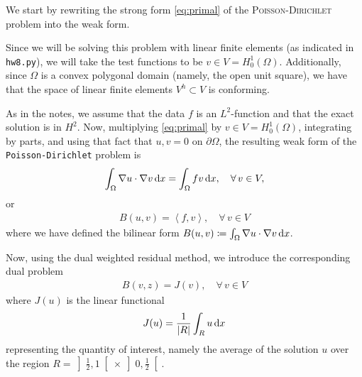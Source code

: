 \begin{solution}
We start by rewriting the strong form \eqref{eq:primal} of the \textsc{Poisson-Dirichlet} problem into the weak form.

Since we will be solving this problem with linear finite elements (as indicated in \texttt{hw8.py}), we will take the test functions to be $v \in V = H_0^1(\Omega)$.
Additionally, since $\Omega$ is a convex polygonal domain (namely, the open unit square), we have that the space of linear finite elements $V^h \subset V$ is conforming.

As in the notes, we assume that the data $f$ is an $L^2$-function and that the exact solution is in $H^2$.
Now, multiplying \eqref{eq:primal} by $v \in V = H_0^1(\Omega)$, integrating by parts, and using that fact that $u,v = 0$ on $\partial \Omega$, the resulting weak form of the \texttt{Poisson-Dirichlet} problem is
\begin{align*}
	\int_\Omega \nabla u \cdot \nabla v \operatorname{d}\!{x}
    = \int_\Omega f v \operatorname{d}\!{x},
    \quad \forall \, v \in V,
\end{align*}
or
\begin{align}\tag{W}\label{eq:primal-weak}
	B(u,v) = \left\langle f, v \right\rangle,
    \quad \forall \, v \in V
\end{align}
where we have defined the bilinear form $B(u,v) \coloneqq \int_\Omega \nabla u \cdot \nabla v \operatorname{d}\!{x}$.

Now, using the dual weighted residual method, we introduce the corresponding dual problem
\begin{align}\tag{W*}\label{eq:dual-weak}
	B(v,z) = J(v),
    \quad \forall \, v \in V
\end{align}
where $J(u)$ is the linear functional
\begin{align}\label{eq:J-defn}
	J(u) = \frac{1}{|R|}\int_R u \operatorname{d}\!{x}
\end{align}
representing the quantity of interest, namely the average of the solution $u$ over the region $R = \left]\frac{1}{2},1\right[ \times \left] 0,\frac{1}{2}\right[$.


\end{solution}
